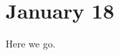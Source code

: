 \documentclass[../notes.tex]{subfiles}
\begin{document}
\section{January 18}

Here we go.

\subsection{}
\end{document}
